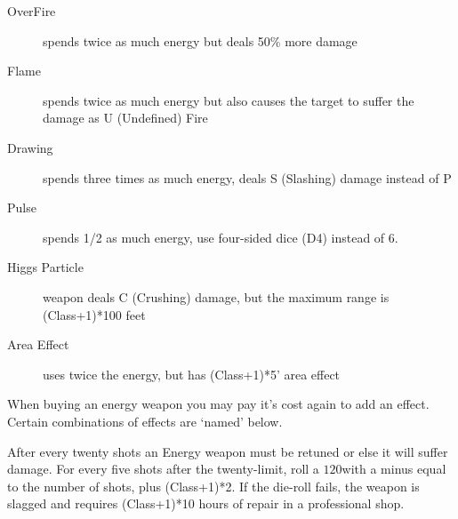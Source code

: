 \documentclass[twoside]{book}
\begin{document}
\begin{description}
    
  \item[ OverFire ] 
    {  
      spends twice as much energy but deals 50\% more
                 damage 
    }
  
  \item[ Flame ] 
    {  
      spends twice as much energy but also causes the
                 target to suffer the damage as U (Undefined) Fire
                 
    }
  
  \item[ Drawing ] 
    {  
      spends three times as much energy, deals S
                 (Slashing) damage instead of P 
    }
  
  \item[ Pulse ] 
    {  
      spends 1/2 as much energy, use four-sided dice
                 (D4) instead of 6. 
    }
  
  \item[ Higgs Particle ] 
    {  
      weapon deals C (Crushing) damage, but the maximum
                 range is (Class+1)*100 feet 
    }
  
  \item[ Area Effect ] 
    {  
      uses twice the energy, but has (Class+1)*5'
                 area effect 
    }
  
\end{description}
  
    {  
      When buying an energy weapon you may pay it's
               cost again to add an effect. Certain combinations of
               effects are `named' below. 
    }
  
    {  
      After every twenty shots an Energy weapon must be
               retuned or else it will suffer damage. For every five
               shots after the twenty-limit, roll a \ensuremath{1}\ensuremath{20}\ensuremath{}with a minus
               equal to the number of shots, plus (Class+1)*2. If the
               die-roll fails, the weapon is slagged and requires
               (Class+1)*10 hours of repair in a professional shop.
               
    }
  
\end{document}

